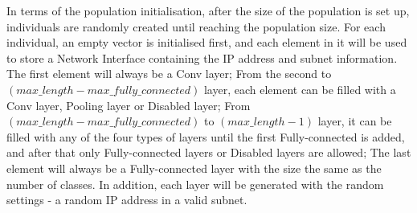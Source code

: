 \documentclass[conference]{IEEEtran}
\begin{document}

In terms of the population initialisation, after the size of the population is set up, individuals are randomly created until reaching the population size.
For each individual, an empty vector is initialised first, and each element in it will be used to store a Network Interface containing the IP address and subnet information. The first element will always be a Conv layer; From the second to $(max\_length-max\_fully\_connected)$ layer, each element can be filled with a Conv layer, Pooling layer or Disabled layer; From $(max\_length-max\_fully\_connected)$ to $(max\_length-1)$ layer, it can be filled with any of the four types of layers until the first Fully-connected is added, and after that only Fully-connected layers or Disabled layers are allowed; The last element will always be a Fully-connected layer with the size the same as the number of classes. In addition, each layer will be generated with the random settings - a random IP address in a valid subnet.
\end{document}
